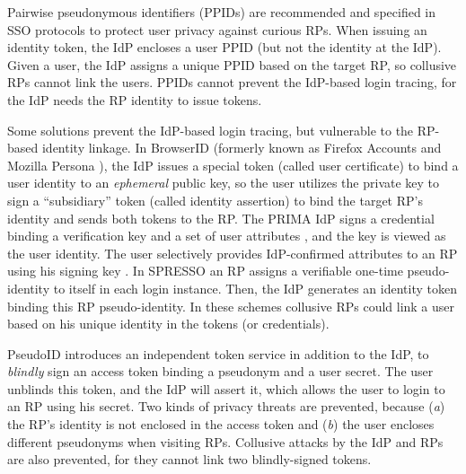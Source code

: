 Pairwise pseudonymous identifiers (PPIDs) are recommended \cite{NIST2017draft}
 and specified in SSO protocols \cite{OpenIDConnect, SAMLIdentifier} to protect user privacy against curious RPs.
When issuing an identity token,
        the IdP encloses a user PPID (but not the identity at the IdP).
Given a user,
    the IdP assigns a unique PPID based on the target RP,
    so collusive RPs cannot link the users.
PPIDs cannot prevent the IdP-based login tracing,
 for the IdP needs the RP identity to issue tokens.



Some solutions prevent the IdP-based login tracing,
    but vulnerable to the RP-based identity linkage.
In BrowserID \cite{BrowserID} (formerly known as Firefox Accounts \cite{FirefoxAccount} and Mozilla Persona \cite{persona}),
 the IdP %
  issues a special token (called user certificate) to bind a user identity to an \emph{ephemeral} public key,
 so the user utilizes the private key to sign a ``subsidiary'' token (called identity assertion)
    to bind the target RP's identity and sends both tokens to the RP.
The PRIMA IdP signs a credential binding a verification key and a set of user attributes \cite{prima}, and the key is viewed as the user identity.
The user selectively provides IdP-confirmed attributes to an RP using his signing key \cite{Oblivion}. %
In SPRESSO \cite{SPRESSO} an RP assigns a verifiable one-time pseudo-identity to itself in each login instance.
Then, the IdP generates an identity token binding this RP pseudo-identity. %
In these schemes \cite{BrowserID,prima,SPRESSO}
    collusive RPs could link a user based on his unique identity in the tokens (or credentials).


PseudoID \cite{PseudoID} introduces an independent token service in addition to the IdP,
    to  \emph{blindly} sign an access token binding a pseudonym and a user secret.
The user unblinds this token,
 and the IdP will assert it,
    which allows the user to login to an RP using his secret.
Two kinds of privacy threats are prevented, because (\emph{a}) the RP's identity is not enclosed in the access token
    and (\emph{b}) the user encloses different pseudonyms when visiting RPs.
Collusive attacks by the IdP and RPs are also prevented,
    for they cannot link two blindly-signed tokens.



